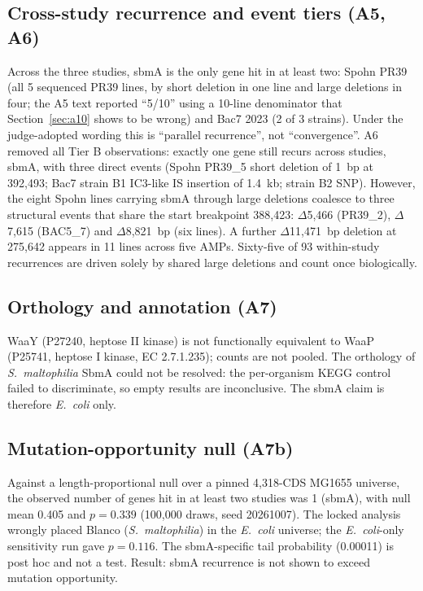 \documentclass[11pt,letterpaper]{article}
\begin{document}
\subsection{Cross-study recurrence and event tiers (A5, A6)}
Across the three studies, sbmA is the only gene hit in at least two: Spohn PR39 (all 5 sequenced PR39 lines, by short deletion in one line and large deletions in four; the A5 text reported ``5/10'' using a 10-line denominator that Section~\ref{sec:a10} shows to be wrong) and Bac7 2023 (2 of 3 strains). Under the judge-adopted wording this is ``parallel recurrence'', not ``convergence''. A6 removed all Tier B observations: exactly one gene still recurs across studies, sbmA, with three direct events (Spohn PR39\_5 short deletion of 1~bp at 392{,}493; Bac7 strain B1 IC3-like IS insertion of 1.4~kb; strain B2 SNP). However, the eight Spohn lines carrying sbmA through large deletions coalesce to three structural events that share the start breakpoint 388{,}423: $\Delta$5{,}466 (PR39\_2), $\Delta$7{,}615 (BAC5\_7) and $\Delta$8{,}821~bp (six lines). A further $\Delta$11{,}471~bp deletion at 275{,}642 appears in 11 lines across five AMPs. Sixty-five of 93 within-study recurrences are driven solely by shared large deletions and count once biologically.

\subsection{Orthology and annotation (A7)}
WaaY (P27240, heptose II kinase) is not functionally equivalent to WaaP (P25741, heptose I kinase, EC 2.7.1.235); counts are not pooled. The orthology of \textit{S.\ maltophilia} SbmA could not be resolved: the per-organism KEGG control failed to discriminate, so empty results are inconclusive. The sbmA claim is therefore \textit{E.\ coli} only.

\subsection{Mutation-opportunity null (A7b)}
Against a length-proportional null over a pinned 4{,}318-CDS MG1655 universe, the observed number of genes hit in at least two studies was 1 (sbmA), with null mean 0.405 and $p=0.339$ (100{,}000 draws, seed 20261007). The locked analysis wrongly placed Blanco (\textit{S.\ maltophilia}) in the \textit{E.\ coli} universe; the \textit{E.\ coli}-only sensitivity run gave $p=0.116$. The sbmA-specific tail probability (0.00011) is post hoc and not a test. Result: sbmA recurrence is not shown to exceed mutation opportunity.
\end{document}

